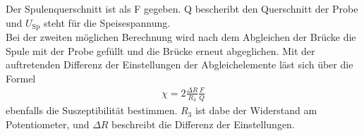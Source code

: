 Der Spulenquerschnitt ist als F gegeben. Q bescheribt den Querschnitt der Probe und $U_{\text{Sp}}$ steht für die Speisespannung.\\
Bei der zweiten möglichen Berechnung wird nach dem Abgleichen der Brücke die Spule mit der Probe gefüllt und die Brücke erneut abgeglichen.
Mit der auftretenden Differenz der Einstellungen der Abgleichelemente läst sich über die Formel
\begin{align}
  \chi=2\frac{\Delta R}{R_3}\frac{F}{Q}
  \label{eqn:suszR}
\end{align}
ebenfalls die Suszeptibilität bestimmen. $R_3$ ist dabe der Widerstand am Potentiometer, und $\Delta R$ beschreibt die Differenz der Einstellungen.
